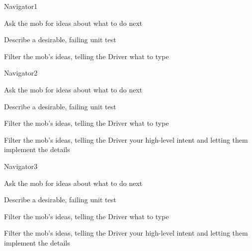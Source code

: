\documentclass[20pt]{extarticle}
\begin{document}
\begin{role}{Navigator}{1}
  \item Ask the mob for ideas about what to do next
  \item Describe a desirable, failing unit test
  \item Filter the mob's ideas, telling the Driver what to type
\end{role}

\begin{role}{Navigator}{2}
  \item Ask the mob for ideas about what to do next
  \item Describe a desirable, failing unit test
  \item Filter the mob's ideas, telling the Driver what to type
  \item Filter the mob's ideas, telling the Driver your high-level
    intent and letting them implement the details
\end{role}

\begin{role}{Navigator}{3}
  \item Ask the mob for ideas about what to do next
  \item Describe a desirable, failing unit test
  \item Filter the mob's ideas, telling the Driver what to type
  \item Filter the mob's ideas, telling the Driver your high-level
    intent and letting them implement the details
\end{role}
\end{document}
